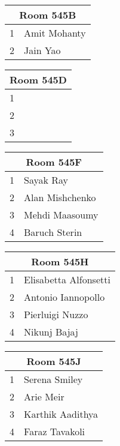 \documentclass{article}
\begin{document}
\Huge
\bfseries

\noindent
\begin{tabular}{|l|l|}
\hline
\multicolumn{2}{|c|}{Room 545B} \\ \hline\hline
1&Amit Mohanty\\
2&Jain Yao\\

\hline
\end{tabular}
\vspace{1in}

\noindent
\begin{tabular}{|l|l|}
\hline
\multicolumn{2}{|c|}{Room 545D} \\ \hline\hline
1& \\
2& \\
3& \\

\hline
\end{tabular}
\vspace{1in}

\noindent
\begin{tabular}{|l|l|}
\hline
\multicolumn{2}{|c|}{Room 545F} \\ \hline\hline
1&Sayak Ray\\
2&Alan Mishchenko\\
3&Mehdi  Maasoumy\\
4&Baruch Sterin\\

\hline
\end{tabular}
\vspace{1in}

\noindent
\begin{tabular}{|l|l|}
\hline
\multicolumn{2}{|c|}{Room 545H} \\ \hline\hline
1&Elisabetta Alfonsetti\\
2&Antonio Iannopollo\\
3&Pierluigi Nuzzo\\
4&Nikunj Bajaj\\

\hline
\end{tabular}
\vspace{1in}

\noindent
\begin{tabular}{|l|l|}
\hline
\multicolumn{2}{|c|}{Room 545J} \\ \hline\hline
1&Serena Smiley\\
2&Arie Meir\\
3&Karthik Aadithya\\
4&Faraz Tavakoli\\

\hline
\end{tabular}
\vspace{1in}
\end{document}
